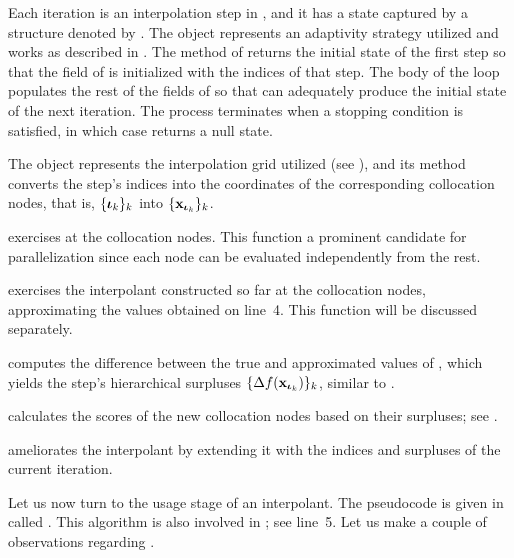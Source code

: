 \begin{compactlist}

 Each iteration is an interpolation step in ,
and it has a state captured by a structure denoted by . The
 object represents an adaptivity strategy utilized and works as
described in . The  method of 
returns the initial state of the first step so that the  field of
 is initialized with the indices of that step. The body of the loop
populates the rest of the fields of  so that  can
adequately produce the initial state of the next iteration. The process
terminates when a stopping condition is satisfied, in which case 
returns a null state.

 The  object represents the interpolation grid
utilized (see ), and its  method converts the step's
indices into the coordinates of the corresponding collocation nodes, that is,
$\{ {\bm{\iota}}_k \}_k$ into $\{ \mathbf{x}_{{\bm{\iota}}_k} \}_k$.

  exercises  at the collocation
nodes. This function a prominent candidate for parallelization since each node
can be evaluated independently from the rest.

  exercises the interpolant constructed so far at
the collocation nodes, approximating the values obtained on line~4. This
function will be discussed separately.

  computes the difference between the true and
approximated values of , which yields the step's hierarchical
surpluses $\{ \Delta f(\mathbf{x}_{{\bm{\iota}}_k}) \}_k$, similar to .

  calculates the scores of the new
collocation nodes based on their surpluses; see .

  ameliorates the interpolant by extending it with
the indices and surpluses of the current iteration.

\end{compactlist}


Let us now turn to the usage stage of an interpolant. The pseudocode is given in
 called . This algorithm is also involved in
; see line~5. Let us make a couple of observations regarding
.

